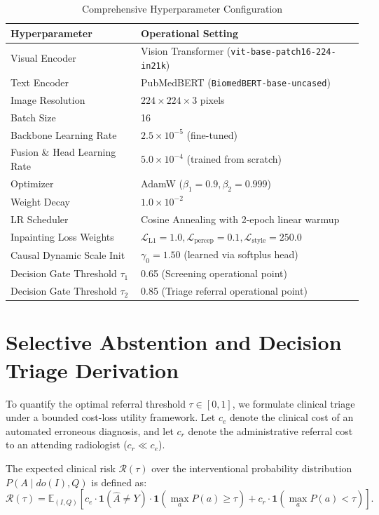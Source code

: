 \documentclass[journal,twocolumn,letterpaper]{IEEEtran}
\begin{document}
\begin{table}[h]
\caption{Comprehensive Hyperparameter Configuration}
\label{tab:supp_hyperparams}
\centering
\begin{tabular}{ll}
\toprule
\textbf{Hyperparameter} & \textbf{Operational Setting} \\
\midrule
Visual Encoder & Vision Transformer (\texttt{vit-base-patch16-224-in21k}) \\
Text Encoder & PubMedBERT (\texttt{BiomedBERT-base-uncased}) \\
Image Resolution & $224 \times 224 \times 3$ pixels \\
Batch Size & 16 \\
Backbone Learning Rate & $2.5 \times 10^{-5}$ (fine-tuned) \\
Fusion \& Head Learning Rate & $5.0 \times 10^{-4}$ (trained from scratch) \\
Optimizer & AdamW ($\beta_1=0.9, \beta_2=0.999$) \\
Weight Decay & $1.0 \times 10^{-2}$ \\
LR Scheduler & Cosine Annealing with 2-epoch linear warmup \\
Inpainting Loss Weights & $\mathcal{L}_{\text{L1}}=1.0, \mathcal{L}_{\text{percep}}=0.1, \mathcal{L}_{\text{style}}=250.0$ \\
Causal Dynamic Scale Init & $\gamma_0 = 1.50$ (learned via softplus head) \\
Decision Gate Threshold $\tau_1$ & 0.65 (Screening operational point) \\
Decision Gate Threshold $\tau_2$ & 0.85 (Triage referral operational point) \\
\bottomrule
\end{tabular}
\end{table}

\section{Selective Abstention and Decision Triage Derivation}
\label{sec:abstention}

To quantify the optimal referral threshold $\tau \in [0, 1]$, we formulate clinical triage under a bounded cost-loss utility framework. Let $c_e$ denote the clinical cost of an automated erroneous diagnosis, and let $c_r$ denote the administrative referral cost to an attending radiologist ($c_r \ll c_e$).

The expected clinical risk $\mathcal{R}(\tau)$ over the interventional probability distribution $P(A \mid do(I), Q)$ is defined as:
\begin{equation}
\mathcal{R}(\tau) = \mathbb{E}_{(I, Q)}\left[ c_e \cdot \mathbf{1}(\hat{A} \ne Y) \cdot \mathbf{1}(\max_a P(a) \ge \tau) + c_r \cdot \mathbf{1}(\max_a P(a) < \tau) \right].
\end{equation}


\end{document}
